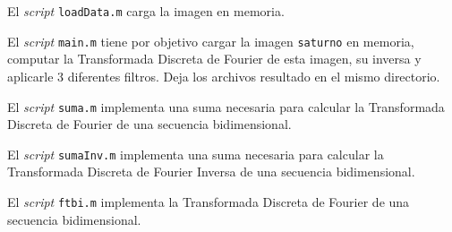 \documentclass{article}
\begin{document}
\par El \textit{script} \verb+loadData.m+ carga la imagen en memoria. 

\begin{ttfamily}
\begin{center}
\end{center}
\end{ttfamily}


\par El \textit{script} \verb+main.m+ tiene por objetivo cargar la imagen \verb+saturno+ en memoria, computar la Transformada Discreta de Fourier de esta imagen, su inversa y aplicarle 3 diferentes filtros. Deja los archivos resultado en el mismo directorio. 

\begin{ttfamily}
\begin{center}
\end{center}
\end{ttfamily}

\par El \textit{script} \verb+suma.m+ implementa una suma necesaria para calcular la Transformada Discreta de Fourier de una secuencia bidimensional.

\begin{ttfamily}
\begin{center}
\end{center}
\end{ttfamily}

\par El \textit{script} \verb+sumaInv.m+ implementa una suma necesaria para calcular la Transformada Discreta de Fourier Inversa de una secuencia bidimensional.

\begin{ttfamily}
\begin{center}
\end{center}
\end{ttfamily}

\par El \textit{script} \verb+ftbi.m+ implementa la Transformada Discreta de Fourier de una secuencia bidimensional.
\end{document}
